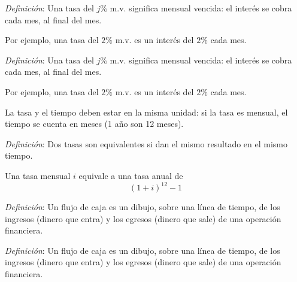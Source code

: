 \documentclass{beamer}
\begin{document}
  \begin{frame}
    \textit{Definición}: Una tasa del $j\%$ m.v. significa mensual vencida: el
    interés se cobra cada mes, al final del mes.
    \newline\newline

    Por ejemplo, una tasa del $2\%$ m.v. es un interés del $2\%$ cada mes.
  \end{frame}

  \begin{frame}
    \textit{Definición}: Una tasa del $j\%$ m.v. significa mensual vencida: el
    interés se cobra cada mes, al final del mes.
    \newline\newline

    Por ejemplo, una tasa del $2\%$ m.v. es un interés del $2\%$ cada mes.
    \newline\newline

    La tasa y el tiempo deben estar en la misma unidad: si la tasa es mensual,
    el tiempo se cuenta en meses (1 año son 12 meses).
  \end{frame}

  \begin{frame}
    \textit{Definición}: Dos tasas son equivalentes si dan el mismo resultado
    en el mismo tiempo.
    \newline\newline

    Una tasa mensual $i$ equivale a una tasa anual de
    \[(1+i)^{12} - 1\]
  \end{frame}

  \begin{frame}
    \textit{Definición}: Un flujo de caja es un dibujo, sobre una línea de
    tiempo, de los ingresos (dinero que entra) y los egresos (dinero que sale)
    de una operación financiera.
  \end{frame}

  \begin{frame}
    \textit{Definición}: Un flujo de caja es un dibujo, sobre una línea de
    tiempo, de los ingresos (dinero que entra) y los egresos (dinero que sale)
    de una operación financiera.

    \begin{center}
    \end{center}
  \end{frame}
\end{document}
